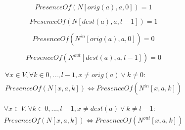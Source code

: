 \documentclass[12pt, a4paper, hidelinks]{article}
\numberwithin{equation}{section}
\begin{document}
\begin{description}\label{eq:equation_set_2}
\item \begin{equation} PresenceOf(N[orig(a),a,0]) = 1 \label{eq:2.1}\end{equation}
\item \begin{equation} PresenceOf(N[dest(a),a,l-1]) = 1 \label{eq:2.2}\end{equation}
\item \begin{equation} PresenceOf(N^{in}[orig(a),a,0]) = 0 \label{eq:2.3}\end{equation}
\item \begin{equation} PresenceOf(N^{out}[dest(a),a,l-1]) = 0 \label{eq:2.4}\end{equation}
\item \begin{equation}\begin{split} \forall x \in V, \forall k \in {0,...,l-1}, x \neq orig(a) \lor k \neq 0: \\ PresenceOf(N[x,a,k]) \iff PresenceOf(N^{in}[x,a,k]) \end{split}\label{eq:2.5}\end{equation}
\item \begin{equation}\begin{split} \forall x \in V, \forall k \in {0,...,l-1}, x \neq dest(a) \lor k \neq l-1: \\ PresenceOf(N[x,a,k]) \iff PresenceOf(N^{out}[x,a,k]) \end{split}\label{eq:2.6}\end{equation}
\end{description}
\end{document}
